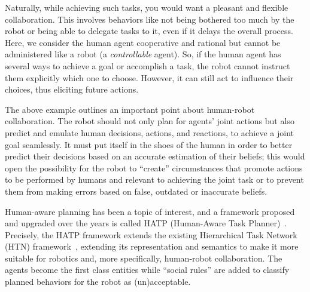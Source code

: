 \documentclass[letterpaper]{article} %
\begin{document}
Naturally, while achieving such tasks, you would want a pleasant and flexible collaboration. This involves behaviors like not being bothered too much by the robot or being able to delegate tasks to it, even if it delays the overall process.
Here, we consider the human agent cooperative and rational but cannot be administered like a robot (a \textit{controllable} agent). 
So, if the human agent has several ways to achieve a goal or accomplish a task, the robot cannot instruct them explicitly which one to choose. However, it can still act to influence their choices, thus eliciting future actions. 

The above example outlines an important point about human-robot collaboration. The robot should not only plan for agents' joint actions but also predict and emulate human decisions, actions, and reactions, to achieve a joint goal seamlessly. 
It must put itself in the shoes of the human in order to better predict their decisions based on an accurate estimation of their beliefs; this would open the possibility for the robot to “create” circumstances that promote actions to be performed by humans and relevant to achieving the joint task or to prevent them from making errors based on false, outdated or inaccurate beliefs.


Human-aware planning has been a topic of interest, and a  framework proposed and upgraded over the years is called HATP (Human-Aware Task Planner)~\cite{alami2006toward,alili2009task,lallement2014hatp,lallement2018hatp}. Precisely, the HATP framework extends the existing Hierarchical Task Network (HTN) framework~\cite{naubooks0014222}, extending its representation and semantics to make it more suitable for robotics and, more specifically, human-robot collaboration. The agents become the first class entities while ``social rules'' are added to classify planned behaviors for the robot as (un)acceptable.
\end{document}
